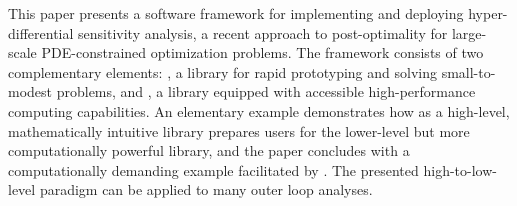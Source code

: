 This paper presents a software framework for implementing and deploying hyper-differential sensitivity analysis, a recent approach to post-optimality for large-scale PDE-constrained optimization problems.
The framework consists of two complementary elements: \SABL, a \MATLAB library for rapid prototyping and solving small-to-modest problems, and \MrHyDE, a \cpp library equipped with accessible high-performance computing capabilities.
An elementary example demonstrates how \SABL as a high-level, mathematically intuitive library prepares users for the lower-level but more computationally powerful \MrHyDE library, and the paper concludes with a computationally demanding example facilitated by \MrHyDE.
The presented high-to-low-level paradigm can be applied to many outer loop analyses.

